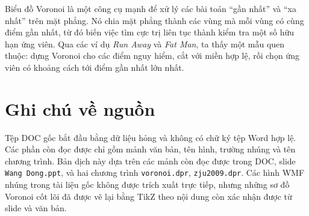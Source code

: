 \documentclass[11pt]{article}
\begin{document}
Biểu đồ Voronoi là một công cụ mạnh để xử lý các bài toán ``gần nhất'' và
``xa nhất'' trên mặt phẳng. Nó chia mặt phẳng thành các vùng mà mỗi vùng có
cùng điểm gần nhất, từ đó biến việc tìm cực trị liên tục thành kiểm tra một
số hữu hạn ứng viên. Qua các ví dụ \textit{Run Away} và \textit{Fat Man}, ta
thấy một mẫu quen thuộc: dựng Voronoi cho các điểm nguy hiểm, cắt với miền
hợp lệ, rồi chọn ứng viên có khoảng cách tới điểm gần nhất lớn nhất.

\section*{Ghi chú về nguồn}

Tệp DOC gốc bắt đầu bằng dữ liệu hỏng và không có chữ ký tệp Word hợp lệ.
Các phần còn đọc được chỉ gồm mảnh văn bản, tên hình, trường nhúng và tên
chương trình. Bản dịch này dựa trên các mảnh còn đọc được trong DOC, slide
\texttt{Wang Dong.ppt}, và hai chương trình \texttt{voronoi.dpr},
\texttt{zju2009.dpr}. Các hình WMF nhúng trong tài liệu gốc không được trích
xuất trực tiếp, nhưng những sơ đồ Voronoi cốt lõi đã được vẽ lại bằng TikZ theo
nội dung còn xác nhận được từ slide và văn bản.
\end{document}

